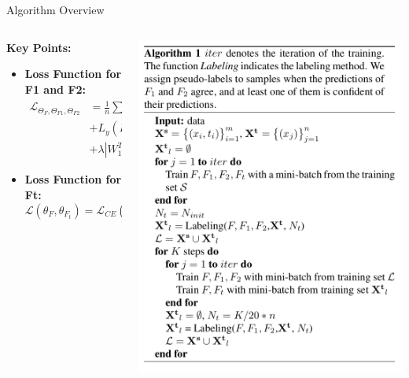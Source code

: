 \documentclass{beamer}
\begin{document}
\begin{frame}{Algorithm Overview}
    \begin{columns}
      \begin{column}{0.5\textwidth}
        \small %
        \textbf{Key Points:}
        \begin{itemize}
          \item \textbf{Loss Function for F1 and F2:}
          \tiny \[
            \begin{aligned}
            \mathcal{L}_{\Theta_F,\Theta_{F1},\Theta_{F2}} &= \frac{1}{n} \sum_{i=1}^{n} [L_y(F_1(F(x_i)); y_i)\\ &+ L_y(F_2(F(x_i)); y_i)] \\
            &+ \lambda |W_1^T W_2|
            \end{aligned}
          \]
          \item \normalsize \textbf{Loss Function for Ft:}
          \tiny \[
             \mathcal{L}(\theta_F, \theta_{F_t}) =
            \mathcal{L}_{CE}(F_t(x_t), \hat{y}_t) 
          \]
        \end{itemize}
      \end{column}
    
      \begin{column}{0.5\textwidth}
        \centering
        \includegraphics[width=\textwidth]{algo_att.png}
      \end{column}
    \end{columns}
\end{frame}
\end{document}
